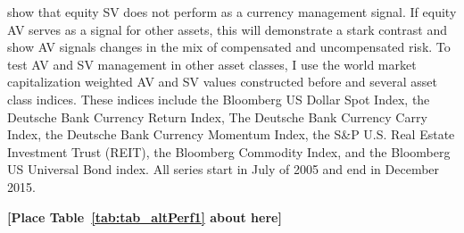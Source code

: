\citet{moreira_volatility-managed_2017} show that equity SV does not perform as a currency management signal. If equity AV serves as a signal for other assets, this will demonstrate a stark contrast and show AV signals changes in the mix of compensated and uncompensated risk. To test AV and SV management in other asset classes, I use the world market capitalization weighted AV and SV values constructed before and several asset class indices. These indices include the Bloomberg US Dollar Spot Index, the Deutsche Bank Currency Return Index, The Deutsche Bank Currency Carry Index, the Deutsche Bank Currency Momentum Index, the S\&P U.S. Real Estate Investment Trust (REIT), the Bloomberg Commodity Index, and the Bloomberg US Universal Bond index. All series start in July of 2005 and end in December 2015.

\bigskip
\centerline{\bf [Place Table~\ref{tab:tab_altPerf1} about here]}
\bigskip


